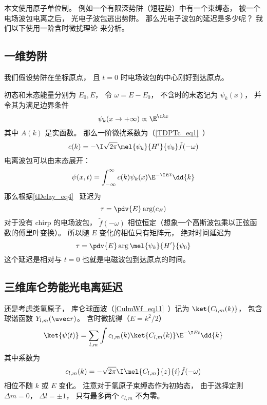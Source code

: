 
\begin{issues}
\issueDraft
\end{issues}


本文使用原子单位制。 例如一个有限深势阱（短程势）中有一个束缚态， 被一个电场波包电离之后， 光电子波包逃出势阱。 那么光电子波包的延迟是多少呢？ 我们以下使用一阶含时微扰理论 来分析。

\subsection{一维势阱}
我们假设势阱在坐标原点， 且 $t = 0$ 时电场波包的中心刚好到达原点。

初态和末态能量分别为 $E_0, E$， 令 $\omega = E - E_0$， 不含时的末态记为 $\psi_k(x)$， 并令其为满足边界条件
\begin{equation}\label{HeAna2_eq2}
\psi_k(x \to +\infty) \propto \E^{\I kx}
\end{equation}
其中 $A(k)$ 是实函数。 那么一阶微扰系数为（\autoref{TDPTc_eq1}~）
\begin{equation}
c(k) = -\I \sqrt{2\pi} \mel{\psi_k}{H'}{\psi_0} \tilde f(-\omega)
\end{equation}
电离波包可以由末态展开：
\begin{equation}
\psi(x, t) = \int_{-\infty}^{\infty} c(k) \psi_k(x)\E^{-\I E t} \dd{k}
\end{equation}
那么根据\autoref{tDelay_eq4}~ 延迟为
\begin{equation}\label{HeAna2_eq3}
\tau = \pdv{E} \arg (c_E)
\end{equation}
对于没有 chirp 的电场波包， $\tilde f(-\omega)$ 相位恒定（想象一个高斯波包乘以正弦函数的傅里叶变换）。 所以随 $E$ 变化的相位只有矩阵元， 绝对时间延迟为
\begin{equation}\label{HeAna2_eq1}
\tau = \pdv{E} \arg \mel{\psi_k}{H'}{\psi_0}
\end{equation}
这个延迟是相对与 $t = 0$ 也就是电磁波包到达原点的时间。

\subsection{三维库仑势能光电离延迟}\label{HeAna2_sub1}
还是考虑类氢原子， 库仑球面波（\autoref{CulmWf_eq11}~）记为 $\ket{C_{l,m}(k)}$， 包含球谐函数 $Y_{l,m}(\uvec r)$。 含时微扰得（$E = k^2/2$）
\begin{equation}\label{HeAna2_eq4}
\ket{\psi(t)} = \sum_{l,m} \int c_{l,m}(k) \ket{C_{l,m}(k)} \E^{-\I E t} \dd{k}
\end{equation}
其中系数为
\begin{equation}
c_{l,m}(k) = -\sqrt{2\pi}\I \mel{C_{l,m}}{z}{i} \tilde f(-\omega)
\end{equation}
相位不随 $k$ 或 $E$ 变化。 注意对于氢原子束缚态作为初始态， 由于选择定则 $\Delta m = 0$， $\Delta l = \pm 1$， 只有最多两个 $c_{l,m}$ 不为零。


